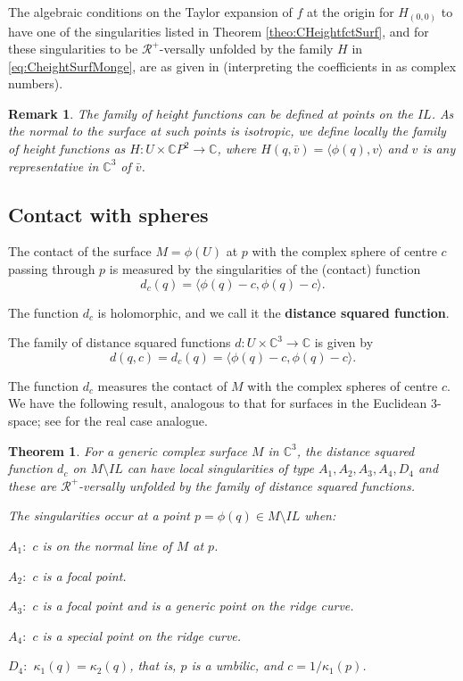 \documentclass[12pt,a4paper]{article}
\newtheorem{theo}[prop]{Theorem}
\newtheorem{rem}[prop]{Remark}
\begin{document}
The algebraic conditions on the Taylor expansion of $f$ at the origin for $H_{(0,0)}$ to have one of the singularities listed in Theorem \ref{theo:CHeightfctSurf}, and for these singularities to be $\mathcal R^+$-versally unfolded by the family $H$ in \eqref{eq:CheightSurfMonge}, 
are as given in \cite[Chapter 6]{IRRT} (interpreting the coefficients in  \cite{IRRT} as complex numbers).

\begin{rem}
{\rm 
The family of height functions can be defined at points on the $IL$. As the normal to the surface at such points
is isotropic, we define locally the family of height functions as 
$H:U\times \mathbb CP^2\to \mathbb C$, where
$H(q,\bar{v})=\langle \phi(q),v\rangle$ and $v$ is any representative in $\mathbb C^3$ of $\bar{v}$.
}
\end{rem}

\subsection{Contact with spheres}\label{ss:contactSpheSurf}

The contact of the surface  $M=\phi(U)$ at $p$ with the complex sphere of centre ${c}$ passing through $p$ is measured by the singularities of the (contact) function 
\begin{equation}
	d_{c}(q)=\langle \phi(q)-c, {\phi(q)-c}\rangle.
\end{equation}

The function $d_c$ is holomorphic, and we call it the {\bf distance squared function}. 

The family of distance squared functions
$d:U\times  \mathbb C^3\to \mathbb C$ is given by 
\begin{equation}
	d(q,c)=d_c(q)=\langle \phi(q)-c, {\phi(q)-c}\rangle.
\end{equation}

The function $d_c$ measures the contact of $M$ with the complex spheres of centre $c$.
We have the following result, analogous to that for surfaces in the Euclidean 3-space; see \cite[Chapter 6]{IRRT} for the real case analogue.

\begin{theo}\label{theo:Cd2fctSurf} 
	For a generic complex surface  $M$ in $\mathbb C^3$, the distance squared function $d_c$ on $M\setminus IL$ can have local singularities of type $A_1,A_2,A_3,A_4,D_4$ and these are $\mathcal R^+$-versally unfolded by the family of distance squared functions. 
	
	The singularities occur at a point $p=\phi(q)\in M\setminus IL$ when:
	
	$A_1:$ $c$ is on the normal line of $M$ at $p$.
	
	$A_2:$ $c$ is a focal point.
	
	$A_3:$  $c$ is a focal point and is a generic point on the ridge curve.
	
	$A_4:$ $c$ is a special point on the ridge curve.
	
	$D_4:$ $\kappa_1(q)=\kappa_2(q)$, that is, $p$ is a umbilic, and $c=1/{\kappa_1(p)} $. 
\end{theo} 
\end{document}
